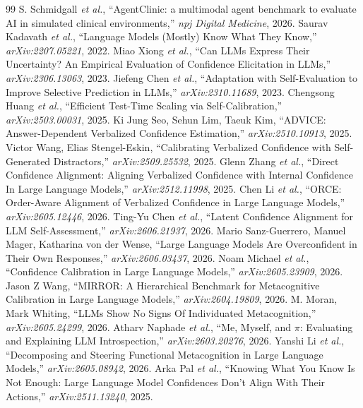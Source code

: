 \documentclass[journal,twoside]{IEEEtran}
\begin{document}
\begin{thebibliography}{99}
 S. Schmidgall \emph{et al.}, ``AgentClinic: a multimodal agent benchmark to evaluate AI in simulated clinical environments,'' \emph{npj Digital Medicine}, 2026.
 Saurav Kadavath \emph{et al.}, ``Language Models (Mostly) Know What They Know,'' \emph{arXiv:2207.05221}, 2022.
 Miao Xiong \emph{et al.}, ``Can LLMs Express Their Uncertainty? An Empirical Evaluation of Confidence Elicitation in LLMs,'' \emph{arXiv:2306.13063}, 2023.
 Jiefeng Chen \emph{et al.}, ``Adaptation with Self-Evaluation to Improve Selective Prediction in LLMs,'' \emph{arXiv:2310.11689}, 2023.
 Chengsong Huang \emph{et al.}, ``Efficient Test-Time Scaling via Self-Calibration,'' \emph{arXiv:2503.00031}, 2025.
 Ki Jung Seo, Sehun Lim, Taeuk Kim, ``ADVICE: Answer-Dependent Verbalized Confidence Estimation,'' \emph{arXiv:2510.10913}, 2025.
 Victor Wang, Elias Stengel-Eskin, ``Calibrating Verbalized Confidence with Self-Generated Distractors,'' \emph{arXiv:2509.25532}, 2025.
 Glenn Zhang \emph{et al.}, ``Direct Confidence Alignment: Aligning Verbalized Confidence with Internal Confidence In Large Language Models,'' \emph{arXiv:2512.11998}, 2025.
 Chen Li \emph{et al.}, ``ORCE: Order-Aware Alignment of Verbalized Confidence in Large Language Models,'' \emph{arXiv:2605.12446}, 2026.
 Ting-Yu Chen \emph{et al.}, ``Latent Confidence Alignment for LLM Self-Assessment,'' \emph{arXiv:2606.21937}, 2026.
 Mario Sanz-Guerrero, Manuel Mager, Katharina von der Wense, ``Large Language Models Are Overconfident in Their Own Responses,'' \emph{arXiv:2606.03437}, 2026.
 Noam Michael \emph{et al.}, ``Confidence Calibration in Large Language Models,'' \emph{arXiv:2605.23909}, 2026.
 Jason Z Wang, ``MIRROR: A Hierarchical Benchmark for Metacognitive Calibration in Large Language Models,'' \emph{arXiv:2604.19809}, 2026.
 M. Moran, Mark Whiting, ``LLMs Show No Signs Of Individuated Metacognition,'' \emph{arXiv:2605.24299}, 2026.
 Atharv Naphade \emph{et al.}, ``Me, Myself, and $\pi$: Evaluating and Explaining LLM Introspection,'' \emph{arXiv:2603.20276}, 2026.
 Yanshi Li \emph{et al.}, ``Decomposing and Steering Functional Metacognition in Large Language Models,'' \emph{arXiv:2605.08942}, 2026.
 Arka Pal \emph{et al.}, ``Knowing What You Know Is Not Enough: Large Language Model Confidences Don't Align With Their Actions,'' \emph{arXiv:2511.13240}, 2025.

\end{thebibliography}
\end{document}
